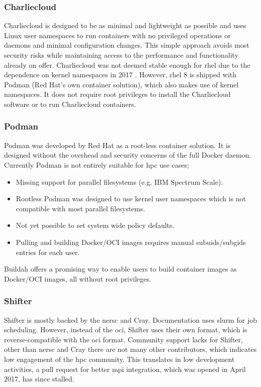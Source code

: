 \documentclass[conference]{IEEEtran}
\begin{document}
\subsubsection{Charliecloud}
Charliecloud is designed to be as minimal and lightweight as possible and uses Linux user namespaces to run containers with no privileged operations or daemons and minimal configuration changes. This simple approach avoids most security risks while maintaining access to the performance and functionality already on offer. Charliecloud was not deemed stable enough for \gls{rhel} due to the dependence on kernel namespaces in 2017 \cite{kurtzer2017singularity}. However, \gls{rhel} 8 is shipped with Podman (Red Hat's own container solution), which also makes use of kernel namespaces. It does not require root privileges to install the Charliecloud software or to run Charliecloud containers.


\subsubsection{Podman}
Podman was developed by Red Hat as a root-less container solution. It is designed without the overhead and security concerns of the full Docker daemon. Currently Podman is not entirely suitable for \gls{hpc} use cases;
\begin{itemize}
    \item Missing support for parallel filesystems (e.g. IBM Spectrum Scale).
    \item Rootless Podman was designed to use kernel user namespaces which is not compatible with most parallel filesystems.
    \item Not yet possible to set system wide policy defaults.
    \item Pulling and building Docker/OCI images requires manual subuids/subgids entries for each user.
\end{itemize}
Buildah offers a promising way to enable users to build container images as Docker/OCI images, all without root privileges.


\subsubsection{Shifter}
Shifter is mostly backed by the \gls{nersc} and Cray. Documentation uses \gls{slurm} for job scheduling. However, instead of the \gls{oci}, Shifter uses their own format, which is reverse-compatible with the \gls{oci} format. Community support lacks for Shifter, other than \gls{nersc} and Cray there are not many other contributors, which indicates low engagement of the \gls{hpc} community. This translates in low development activities, a pull request for better \gls{mpi} integration, which was opened in April 2017, has since stalled.
\end{document}
